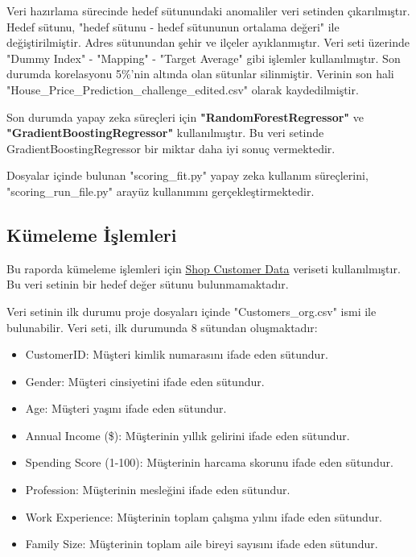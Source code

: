 Veri hazırlama sürecinde hedef sütunundaki anomaliler veri setinden çıkarılmıştır. Hedef sütunu, "hedef sütunu - hedef sütununun ortalama değeri" ile değiştirilmiştir. Adres sütunundan şehir ve ilçeler ayıklanmıştır. Veri seti üzerinde "Dummy Index" - "Mapping" - "Target Average" gibi işlemler kullanılmıştır. Son durumda korelasyonu 5\%'nin altında olan sütunlar silinmiştir. Verinin son hali "House\_Price\_Prediction\_challenge\_edited.csv" olarak kaydedilmiştir.

Son durumda yapay zeka süreçleri için \textbf{"RandomForestRegressor"} ve \textbf{"GradientBoostingRegressor"} kullanılmıştır. Bu veri setinde GradientBoostingRegressor bir miktar daha iyi sonuç vermektedir.

Dosyalar içinde bulunan "scoring\_fit.py" yapay zeka kullanım süreçlerini, "scoring\_run\_file.py" arayüz kullanımını gerçekleştirmektedir.

\newpage
\subsection{Kümeleme İşlemleri}

Bu raporda kümeleme işlemleri için  \href{https://www.kaggle.com/datasets/datascientistanna/customers-dataset/data}{Shop Customer Data} veriseti kullanılmıştır. Bu veri setinin bir hedef değer sütunu bulunmamaktadır.

Veri setinin ilk durumu proje dosyaları içinde "Customers\_org.csv" ismi ile bulunabilir. Veri seti, ilk durumunda 8 sütundan oluşmaktadır:
\begin{small}
\begin{itemize}
\item CustomerID: Müşteri kimlik numarasını ifade eden sütundur.
\item Gender: Müşteri cinsiyetini ifade eden sütundur.
\item Age: Müşteri yaşını ifade eden sütundur.
\item Annual Income (\$): Müşterinin yıllık gelirini ifade eden sütundur.
\item Spending Score (1-100): Müşterinin harcama skorunu ifade eden sütundur.
\item Profession: Müşterinin mesleğini ifade eden sütundur.
\item Work Experience: Müşterinin toplam çalışma yılını ifade eden sütundur.
\item Family Size: Müşterinin toplam aile bireyi sayısını ifade eden sütundur.
\end{itemize}
\end{small}

